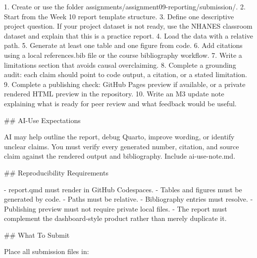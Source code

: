 \documentclass[
  letterpaper,
  DIV=11,
  numbers=noendperiod,
  oneside]{scrreprt}
\newenvironment{Shaded}{\begin{snugshade}}{\end{snugshade}}
\newcommand{\FunctionTok}[1]{\textcolor[rgb]{0.28,0.35,0.67}{#1}}
\newcommand{\InformationTok}[1]{\textcolor[rgb]{0.37,0.37,0.37}{#1}}
\newcommand{\NormalTok}[1]{\textcolor[rgb]{0.00,0.23,0.31}{#1}}
\newcommand{\SpecialStringTok}[1]{\textcolor[rgb]{0.13,0.47,0.30}{#1}}
\begin{document}
\begin{Shaded}
\begin{Highlighting}[numbers=left,,]
\SpecialStringTok{1. }\NormalTok{Create or use the folder }\InformationTok{\textasciigrave{}assignments/assignment09{-}reporting/submission/\textasciigrave{}}\NormalTok{.}
\SpecialStringTok{2. }\NormalTok{Start from the Week 10 report template structure.}
\SpecialStringTok{3. }\NormalTok{Define one descriptive project question. If your project dataset is not ready, use the NHANES classroom dataset and explain that this is a practice report.}
\SpecialStringTok{4. }\NormalTok{Load the data with a relative path.}
\SpecialStringTok{5. }\NormalTok{Generate at least one table and one figure from code.}
\SpecialStringTok{6. }\NormalTok{Add citations using a local }\InformationTok{\textasciigrave{}references.bib\textasciigrave{}}\NormalTok{ file or the course bibliography workflow.}
\SpecialStringTok{7. }\NormalTok{Write a limitations section that avoids causal overclaiming.}
\SpecialStringTok{8. }\NormalTok{Complete a grounding audit: each claim should point to code output, a citation, or a stated limitation.}
\SpecialStringTok{9. }\NormalTok{Complete a publishing check: GitHub Pages preview if available, or a private rendered HTML preview in the repository.}
\SpecialStringTok{10. }\NormalTok{Write an M3 update note explaining what is ready for peer review and what feedback would be useful.}

\FunctionTok{\#\# AI{-}Use Expectations}

\NormalTok{AI may help outline the report, debug Quarto, improve wording, or identify unclear claims. You must verify every generated number, citation, and source claim against the rendered output and bibliography. Include }\InformationTok{\textasciigrave{}ai{-}use{-}note.md\textasciigrave{}}\NormalTok{.}

\FunctionTok{\#\# Reproducibility Requirements}

\SpecialStringTok{{-} }\InformationTok{\textasciigrave{}report.qmd\textasciigrave{}}\NormalTok{ must render in GitHub Codespaces.}
\SpecialStringTok{{-} }\NormalTok{Tables and figures must be generated by code.}
\SpecialStringTok{{-} }\NormalTok{Paths must be relative.}
\SpecialStringTok{{-} }\NormalTok{Bibliography entries must resolve.}
\SpecialStringTok{{-} }\NormalTok{Publishing preview must not require private local files.}
\SpecialStringTok{{-} }\NormalTok{The report must complement the dashboard{-}style product rather than merely duplicate it.}

\FunctionTok{\#\# What To Submit}

\NormalTok{Place all submission files in:}


\end{Highlighting}
\end{Shaded}
\end{document}
